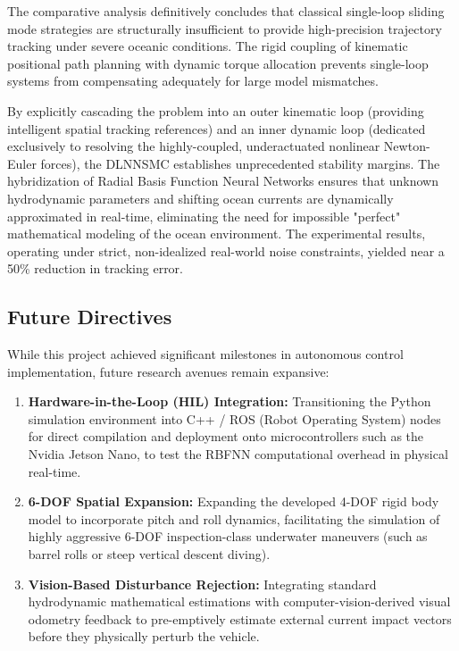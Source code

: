 \documentclass[conference]{IEEEtran}
\begin{document}
The comparative analysis definitively concludes that classical single-loop sliding mode strategies are structurally insufficient to provide high-precision trajectory tracking under severe oceanic conditions. The rigid coupling of kinematic positional path planning with dynamic torque allocation prevents single-loop systems from compensating adequately for large model mismatches. 

By explicitly cascading the problem into an outer kinematic loop (providing intelligent spatial tracking references) and an inner dynamic loop (dedicated exclusively to resolving the highly-coupled, underactuated nonlinear Newton-Euler forces), the DLNNSMC establishes unprecedented stability margins. The hybridization of Radial Basis Function Neural Networks ensures that unknown hydrodynamic parameters and shifting ocean currents are dynamically approximated in real-time, eliminating the need for impossible "perfect" mathematical modeling of the ocean environment. The experimental results, operating under strict, non-idealized real-world noise constraints, yielded near a 50\% reduction in tracking error.

\subsection{Future Directives}
While this project achieved significant milestones in autonomous control implementation, future research avenues remain expansive:
\begin{enumerate}
    \item \textbf{Hardware-in-the-Loop (HIL) Integration:} Transitioning the Python simulation environment into C++ / ROS (Robot Operating System) nodes for direct compilation and deployment onto microcontrollers such as the Nvidia Jetson Nano, to test the RBFNN computational overhead in physical real-time.
    \item \textbf{6-DOF Spatial Expansion:} Expanding the developed 4-DOF rigid body model to incorporate pitch and roll dynamics, facilitating the simulation of highly aggressive 6-DOF inspection-class underwater maneuvers (such as barrel rolls or steep vertical descent diving).
    \item \textbf{Vision-Based Disturbance Rejection:} Integrating standard hydrodynamic mathematical estimations with computer-vision-derived visual odometry feedback to pre-emptively estimate external current impact vectors before they physically perturb the vehicle.
\end{enumerate}
\end{document}
